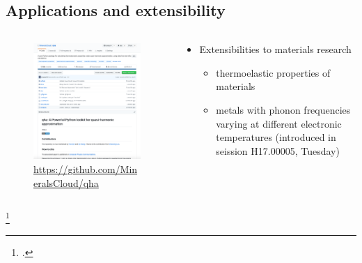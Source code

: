\documentclass[13pt,aspectratio=169]{beamer}
\begin{document}
\subsection{Applications and extensibility}
\begin{frame}{\subsecname}
	\begin{columns}
		\begin{column}{0.45\textwidth}
			\begin{figure}
				\includegraphics[height=0.7\textheight]{images/website}%
				\captionsetup{labelformat=empty}
				\caption{\scriptsize\url{https://github.com/MineralsCloud/qha}}
			\end{figure}
		\end{column}

		\begin{column}{0.45\textwidth}
			\begin{itemize}[<+(1)->]
				\item Extensibilities to materials research
				      \begin{itemize}
					      \item thermoelastic properties of materials \footnotemark
					      \item metals with phonon frequencies varying at different electronic temperatures (introduced in seission H17.00005, Tuesday)
				      \end{itemize}
			\end{itemize}
		\end{column}
	\end{columns}
	\setcounter{footnote}{7}
	\footcitetext{Wu:2011ea}
\end{frame}
\end{document}
